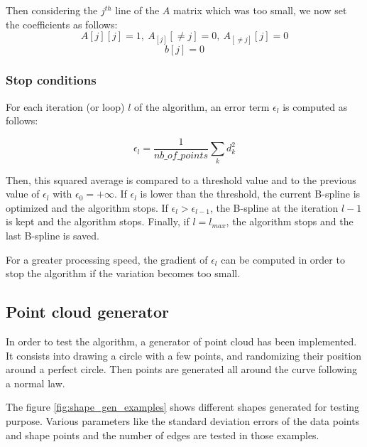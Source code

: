 \documentclass{article}
\newcommand{\vsp}{\vspace{\baselineskip}}
\begin{document}
Then considering the $j^{th}$ line of the $A$ matrix which was too small, we now set the coefficients as follows:
$$ A[j][j] = 1,\ A_[j][\neq j] = 0,\ A_[\neq j][j] = 0 $$
$$ b[j] = 0 $$

\subsubsection{Stop conditions} \label{sec:stop_condition}

For each iteration (or loop) $l$ of the algorithm, an error term $\epsilon_l$ is computed as follows:

\begin{equation}
    \epsilon_l = \frac{1}{nb\_of\_points}\sum_k d_k^2
\end{equation}

Then, this squared average is compared to a threshold value and to the previous value of $\epsilon_l$ with $\epsilon_0 = +\infty$. If $\epsilon_l$ is lower than the threshold, the current B-spline is optimized and the algorithm stops. If $\epsilon_l > \epsilon_{l-1}$, the B-spline at the iteration $l-1$ is kept and the algorithm stops. Finally, if $l = l_{max}$, the algorithm stops and the last B-spline is saved.

\vsp

For a greater processing speed, the gradient of $\epsilon_l$ can be computed in order to stop the algorithm if the variation becomes too small.

\subsection{Point cloud generator}

In order to test the algorithm, a generator of point cloud has been implemented. It consists into drawing a circle with a few points, and randomizing their position around a perfect circle. Then points are generated all around the curve following a normal law.

\vsp

The figure \ref{fig:shape_gen_examples} shows different shapes generated for testing purpose. Various parameters like the standard deviation errors of the data points and shape points and the number of edges are tested in those examples. 
\end{document}
